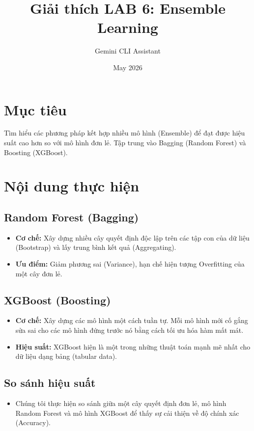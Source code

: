\documentclass{article}
\title{Giải thích LAB 6: Ensemble Learning}
\author{Gemini CLI Assistant}
\date{May 2026}
\begin{document}
\maketitle

\section{Mục tiêu}
Tìm hiểu các phương pháp kết hợp nhiều mô hình (Ensemble) để đạt được hiệu suất cao hơn so với mô hình đơn lẻ. Tập trung vào Bagging (Random Forest) và Boosting (XGBoost).

\section{Nội dung thực hiện}

\subsection{Random Forest (Bagging)}
\begin{itemize}
    \item \textbf{Cơ chế:} Xây dựng nhiều cây quyết định độc lập trên các tập con của dữ liệu (Bootstrap) và lấy trung bình kết quả (Aggregating).
    \item \textbf{Ưu điểm:} Giảm phương sai (Variance), hạn chế hiện tượng Overfitting của một cây đơn lẻ.
\end{itemize}

\subsection{XGBoost (Boosting)}
\begin{itemize}
    \item \textbf{Cơ chế:} Xây dựng các mô hình một cách tuần tự. Mỗi mô hình mới cố gắng sửa sai cho các mô hình đứng trước nó bằng cách tối ưu hóa hàm mất mát.
    \item \textbf{Hiệu suất:} XGBoost hiện là một trong những thuật toán mạnh mẽ nhất cho dữ liệu dạng bảng (tabular data).
\end{itemize}

\subsection{So sánh hiệu suất}
\begin{itemize}
    \item Chúng tôi thực hiện so sánh giữa một cây quyết định đơn lẻ, mô hình Random Forest và mô hình XGBoost để thấy sự cải thiện về độ chính xác (Accuracy).
\end{itemize}
\end{document}
